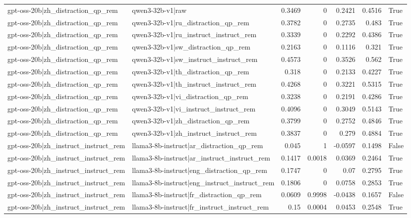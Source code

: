\begin{table}
\begin{tabular}{l l r r r r l}
gpt-oss-20b|zh_distraction_qp_rem & qwen3-32b-v1|raw & 0.3469 & 0 & 0.2421 & 0.4516 & True \\
gpt-oss-20b|zh_distraction_qp_rem & qwen3-32b-v1|ru_distraction_qp_rem & 0.3782 & 0 & 0.2735 & 0.483 & True \\
gpt-oss-20b|zh_distraction_qp_rem & qwen3-32b-v1|ru_instruct_instruct_rem & 0.3339 & 0 & 0.2292 & 0.4386 & True \\
gpt-oss-20b|zh_distraction_qp_rem & qwen3-32b-v1|sw_distraction_qp_rem & 0.2163 & 0 & 0.1116 & 0.321 & True \\
gpt-oss-20b|zh_distraction_qp_rem & qwen3-32b-v1|sw_instruct_instruct_rem & 0.4573 & 0 & 0.3526 & 0.562 & True \\
gpt-oss-20b|zh_distraction_qp_rem & qwen3-32b-v1|th_distraction_qp_rem & 0.318 & 0 & 0.2133 & 0.4227 & True \\
gpt-oss-20b|zh_distraction_qp_rem & qwen3-32b-v1|th_instruct_instruct_rem & 0.4268 & 0 & 0.3221 & 0.5315 & True \\
gpt-oss-20b|zh_distraction_qp_rem & qwen3-32b-v1|vi_distraction_qp_rem & 0.3238 & 0 & 0.2191 & 0.4286 & True \\
gpt-oss-20b|zh_distraction_qp_rem & qwen3-32b-v1|vi_instruct_instruct_rem & 0.4096 & 0 & 0.3049 & 0.5143 & True \\
gpt-oss-20b|zh_distraction_qp_rem & qwen3-32b-v1|zh_distraction_qp_rem & 0.3799 & 0 & 0.2752 & 0.4846 & True \\
gpt-oss-20b|zh_distraction_qp_rem & qwen3-32b-v1|zh_instruct_instruct_rem & 0.3837 & 0 & 0.279 & 0.4884 & True \\
gpt-oss-20b|zh_instruct_instruct_rem & llama3-8b-instruct|ar_distraction_qp_rem & 0.045 & 1 & -0.0597 & 0.1498 & False \\
gpt-oss-20b|zh_instruct_instruct_rem & llama3-8b-instruct|ar_instruct_instruct_rem & 0.1417 & 0.0018 & 0.0369 & 0.2464 & True \\
gpt-oss-20b|zh_instruct_instruct_rem & llama3-8b-instruct|eng_distraction_qp_rem & 0.1747 & 0 & 0.07 & 0.2795 & True \\
gpt-oss-20b|zh_instruct_instruct_rem & llama3-8b-instruct|eng_instruct_instruct_rem & 0.1806 & 0 & 0.0758 & 0.2853 & True \\
gpt-oss-20b|zh_instruct_instruct_rem & llama3-8b-instruct|fr_distraction_qp_rem & 0.0609 & 0.9998 & -0.0438 & 0.1657 & False \\
gpt-oss-20b|zh_instruct_instruct_rem & llama3-8b-instruct|fr_instruct_instruct_rem & 0.15 & 0.0004 & 0.0453 & 0.2548 & True \\

\end{tabular}
\end{table}
